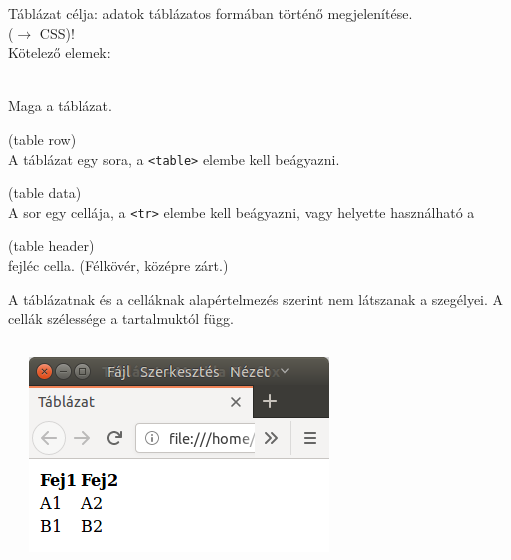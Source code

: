 \begin{frame}
  Táblázat célja: adatok táblázatos formában történő megjelenítése.\\
   ($\to$ CSS)!\\
  Kötelező elemek:
  \begin{description}[m]
    \item[\texttt{<table>}] \hfill \\ Maga a táblázat.
    \item[\texttt{<tr>}] (table row) \hfill \\ A táblázat egy sora, a \texttt{<table>} elembe kell beágyazni.
    \item[\texttt{<td>}] (table data) \hfill \\ A sor egy cellája, a \texttt{<tr>} elembe kell beágyazni, vagy helyette használható a
    \item[\texttt{<th>}] (table header) \hfill \\ fejléc cella. (Félkövér, középre zárt.)
  \end{description}
  A táblázatnak és a celláknak alapértelmezés szerint nem látszanak a szegélyei. A cellák szélessége a tartalmuktól függ.
\end{frame}

\begin{frame}
  \begin{columns}[c]
      \begin{exampleblock}{}
        
      \end{exampleblock}
      \centering \includegraphics[width=\textwidth]{tabla1.png}
  \end{columns} 
\end{frame}

